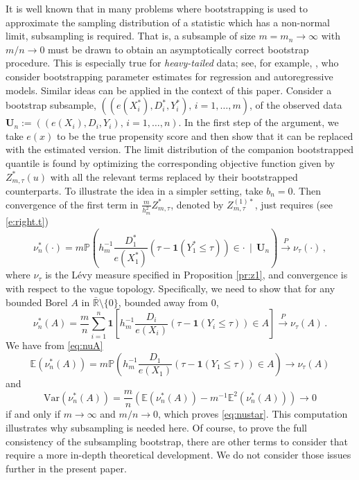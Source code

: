 \documentclass[12pt]{amsart}
\newcommand{\R}{\mathbb{R}}
\newcommand{\1}{\mathbbm{1}}
\newcommand{\bU}{\mathbf{U}}
\newcommand{\0}{\mathbf{0}}
\newcommand{\one}{\mathbf{1}}
\newcommand{\E}{\mathbb{E}}
\theoremstyle{plain}
\theoremstyle{definition}
\newcommand{\bbP}{\mathbb{P}}
\newcommand{\cip}{\overset{P}\to}
\begin{document}
 It is well known that in many problems where bootstrapping is used to approximate the sampling distribution of a statistic which has a non-normal limit,   subsampling is required.  That is, a subsample of size $m=m_n\to\infty$ with $m/n\to0$ must be drawn to obtain an asymptotically correct bootstrap procedure.  This is especially true for {\it heavy-tailed} data; see, for example, \cite{davis1997bootstrapping}, who consider bootstrapping parameter estimates for regression and autoregressive models.  Similar ideas can be applied in the context of this paper.  Consider a bootstrap subsample, $((e(X_i^*),D_i^*, Y_i^*), \,i=1,\ldots,m)$, of the observed data $\bU_n:=((e(X_i),D_i, Y_i), \,i=1,\ldots,n)$.  In the first step of the argument, we take $e(x)$ to be the true propensity score and then show that it can be replaced  with the estimated version.  The limit distribution of the companion bootstrapped quantile is found by optimizing the corresponding objective function given by $Z_{m,\tau}^*(u)$ with all the relevant terms replaced by their bootstrapped counterparts. To illustrate the idea in a simpler setting,  take $b_n=0$.  Then convergence of the first term in $\frac{m}{h_m^2}Z_{m,\tau}^*$,  denoted by $Z_{m,\tau}^{(1)*}$, just requires (see \eqref{e:right.t})
\begin{equation*}
\nu_n^*(\cdot)=m\bbP(h_{m}^{-1}\frac{D_1^*}{e(X_1^*)}\left(\tau-\one(Y_1^*\le \tau)\right)\in \cdot\,\mid\, \bU_n)\cip \nu_\tau(\cdot)\,,
\end{equation*}
where $\nu_\tau$ is the L\'evy measure specified in Proposition \ref{pr:z1}, and convergence is with respect to the vague topology.
Specifically, we need to show that for any bounded Borel $A$  in $\bar{\R}\setminus\{0\}$, bounded away from 0, 
\begin{equation}  \label{eq:nustar}
\nu_n^*(A)=\frac{m}{n}\sum_{i=1}^n\one\left[h_m^{-1}\frac{D_i}{e(X_i)}\left(\tau-\one(Y_i\le \tau)\right)\in A\right]\cip \nu_\tau(A)\,.
\end{equation}
We have from \eqref{eq:nuA}
\begin{equation*}
  \E( \nu_n^*(A))=m\bbP(h_{m}^{-1}\frac{D_1}{e(X_1)}\left(\tau-\one(Y_1\le \tau)\right)\in A)\to \nu_\tau(A) 
\end{equation*}
and
\begin{equation*}
  \mbox{Var}( \nu_n^*(A))= \frac{m}{n}\left(\E( \nu_n^*(A))-m^{-1}\E^2( \nu_n^*(A))\right)\to0
\end{equation*}
if and only if $m\to\infty$ and $m/n\to0$, which proves \eqref{eq:nustar}.  This computation illustrates why subsampling is needed here. Of course, to prove the full consistency of the subsampling bootstrap, there are other terms to consider that require  a more in-depth theoretical development.  We do not consider those issues further in the present paper.  



\newpage






\end{document}
